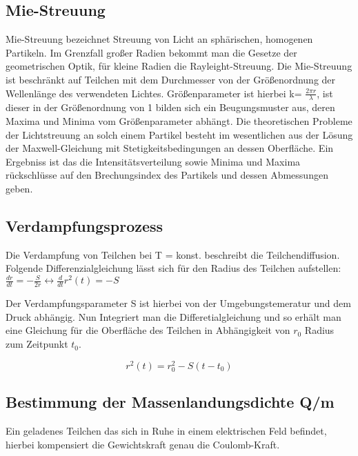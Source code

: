 \documentclass[10pt,a4paper]{article}
\begin{document}
\subsection{Mie-Streuung}

Mie-Streuung bezeichnet Streuung von Licht an  sphärischen, homogenen Partikeln. Im Grenzfall großer Radien bekommt man die Gesetze der geometrischen Optik, für kleine Radien die Rayleight-Streuung. Die Mie-Streuung ist beschränkt auf Teilchen mit dem Durchmesser von der Größenordnung der Wellenlänge des verwendeten Lichtes.
Größenparameter ist hierbei k= $\frac {2\pi r}{\lambda}$, ist dieser in der Größenordnung von 1 bilden sich ein Beugungsmuster aus, deren Maxima und Minima vom Größenparameter abhängt.
Die theoretischen Probleme der Lichtstreuung an solch einem Partikel besteht im wesentlichen aus der Lösung der Maxwell-Gleichung mit Stetigkeitsbedingungen an dessen Oberfläche. Ein Ergebniss ist das die Intensitätsverteilung sowie Minima und Maxima rückschlüsse auf den Brechungsindex des Partikels und dessen Abmessungen geben.

\subsection{Verdampfungsprozess}

Die Verdampfung von Teilchen bei T = konst. beschreibt die Teilchendiffusion. Folgende Differenzialgleichung lässt sich für den Radius des Teilchen aufstellen:\\

$\frac{dr}{dt}= -\frac {S}{2r} \leftrightarrow \frac {d}{dt}r^2(t)=-S
$

Der Verdampfungsparameter S ist hierbei von der Umgebungstemeratur und dem Druck abhängig. Nun Integriert man die Differetialgleichung und so erhält man eine Gleichung für die Oberfläche des Teilchen in Abhängigkeit von $r_0$ Radius zum Zeitpunkt $t_0$. 

\begin{equation}
r^2(t)= r_0^2-S(t-t_0)
\label {6}
\end{equation}





\subsection{Bestimmung der Massenlandungsdichte Q/m}

Ein geladenes Teilchen das sich in Ruhe in einem elektrischen Feld befindet, hierbei kompensiert die Gewichtskraft genau die Coulomb-Kraft.\\
\end{document}
